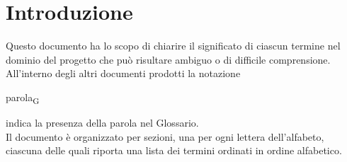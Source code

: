 \documentclass[a4paper,12pt]{article}
\begin{document}
        \section*{Introduzione} {
            Questo documento ha lo scopo di chiarire il significato di ciascun termine nel dominio del progetto che può risultare ambiguo o di difficile comprensione.\\
            All'interno degli altri documenti prodotti la notazione
            \begin{center}
                parola\textsubscript{G}
            \end{center}
            indica la presenza della parola nel Glossario.\\
            Il documento è organizzato per sezioni, una per ogni lettera dell'alfabeto, ciascuna delle quali riporta una lista dei termini ordinati in ordine alfabetico.
        }
        \newpage
\end{document}
